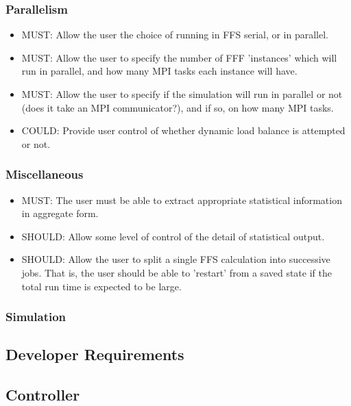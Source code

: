 \documentclass[11pt]{article}
\begin{document}
\subsubsection{Parallelism}
\begin{itemize}
\item
MUST: Allow the user the choice of running in FFS serial, or in parallel.
\item
MUST: Allow the user to specify the number of FFF 'instances' which will
run in parallel, and how many MPI tasks each instance will have.
\item
MUST: Allow the user to specify if the simulation will run in parallel
or not (does it take an MPI communicator?), and if so, on how many
MPI tasks.
\item
COULD: Provide user control of whether dynamic load balance is attempted
or not.
\end{itemize}

\subsubsection{Miscellaneous}

\begin{itemize}
\item
MUST: The user must be able to extract appropriate statistical information
in aggregate form.
\item
SHOULD: Allow some level of control of the detail of statistical output.
\item
SHOULD: Allow the user to split a single FFS calculation into successive
jobs. That is, the user should be able to 'restart' from a saved state
if the total run time is expected to be large.
\end{itemize}

\subsubsection{Simulation}


\subsection{Developer Requirements}


\subsection{Controller}
\end{document}
